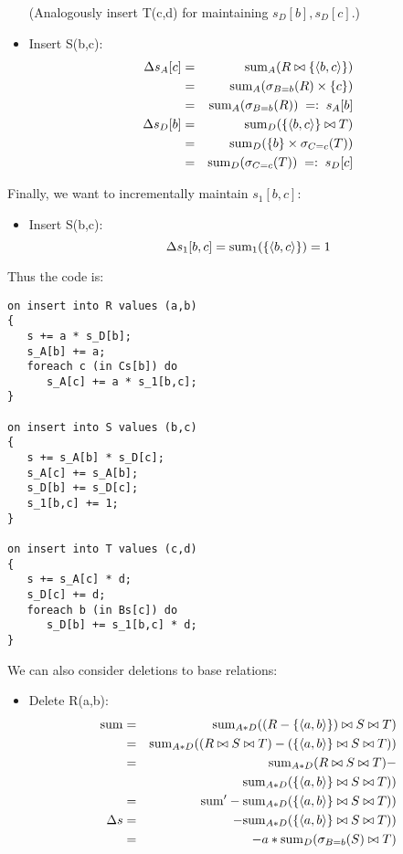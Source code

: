 \begin{example}
\begin{itemize}
(Analogously insert T(c,d) for maintaining $s_{D}[b], s_{D}[c]$.)

\item
Insert S(b,c):
\begin{eqnarray*}
\Delta s_A[c] &=&
\mathrm{sum}_{A}(R \bowtie \{{\langle b,c\rangle}\})
\\ &=&
\mathrm{sum}_{A}(\sigma_{B=b}(R) \times \{c\})
\\ &=&
\mathrm{sum}_{A}(\sigma_{B=b}(R))
\;=:\; s_A[b]
\\
\Delta s_D[b] &=&
\mathrm{sum}_{D}(\{{\langle b,c\rangle}\} \bowtie T)
\\ &=&
\mathrm{sum}_{D}(\{b\} \times \sigma_{C=c}(T))
\\ &=&
\mathrm{sum}_{D}(\sigma_{C=c}(T))
\;=:\; s_D[c]
\end{eqnarray*}
\end{itemize}

Finally, we want to incrementally maintain $s_1[b,c]$:
\begin{itemize}
\item
Insert S(b,c):
\[
\Delta s_1[b,c] =
\mathrm{sum}_{1}(\{{\langle b,c\rangle}\}) = 1
\]
\end{itemize}

Thus the code is:
\begin{verbatim}
on insert into R values (a,b)
{
   s += a * s_D[b];
   s_A[b] += a;
   foreach c (in Cs[b]) do
      s_A[c] += a * s_1[b,c];
}

on insert into S values (b,c)
{
   s += s_A[b] * s_D[c];
   s_A[c] += s_A[b];
   s_D[b] += s_D[c];
   s_1[b,c] += 1;
}

on insert into T values (c,d)
{
   s += s_A[c] * d;
   s_D[c] += d;
   foreach b (in Bs[c]) do
      s_D[b] += s_1[b,c] * d;
}
\end{verbatim}
\punto

We can also consider deletions to base relations:

\begin{itemize}
\item
Delete R(a,b):
\begin{eqnarray*}
\mathrm{sum} &=& \mathrm{sum}_{A*D}((R-\{{\langle a,b\rangle}\}) \bowtie S \bowtie T)\\
&=& \mathrm{sum}_{A*D}((R \bowtie S \bowtie T) -
(\{{\langle a,b\rangle}\} \bowtie S \bowtie T))\\
&=& \mathrm{sum}_{A*D}(R \bowtie S \bowtie T) -\\
& & \mathrm{sum}_{A*D}(\{{\langle a,b\rangle}\} \bowtie S \bowtie T))\\
&=& \mathrm{sum}' - \mathrm{sum}_{A*D}(\{{\langle a,b\rangle}\} \bowtie S \bowtie T))\\
\Delta s &=&  - \mathrm{sum}_{A*D}(\{{\langle a,b\rangle}\} \bowtie S \bowtie T))\\
&=& -a*\mathrm{sum}_{D}(\sigma_{B=b}(S) \bowtie T)
\end{eqnarray*} 
\end{itemize}


\end{example}
